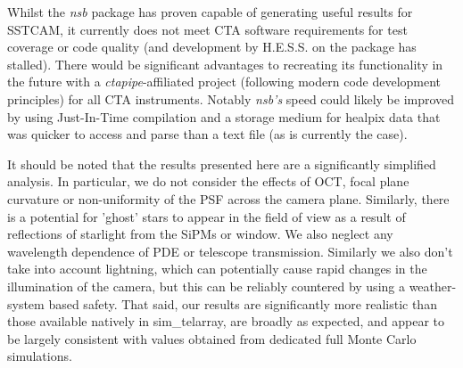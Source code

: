Whilst the \textit{nsb} package has proven capable of generating useful results for SSTCAM, it currently does not meet CTA software requirements for test coverage or code quality (and development by H.E.S.S. on the package has stalled). There would be significant advantages to recreating its functionality in the future with a \textit{ctapipe}-affiliated project (following modern code development principles) for all CTA instruments. Notably \textit{nsb's} speed could likely be improved by using Just-In-Time compilation and a storage medium for healpix data that was quicker to access and parse than a text file (as is currently the case).

It should be noted that the results presented here are a significantly simplified analysis. In particular, we do not consider the effects of OCT, focal plane curvature or non-uniformity of the PSF across the camera plane. Similarly, there is a potential for 'ghost' stars to appear in the field of view as a result of reflections of starlight from the SiPMs or window. We also neglect any wavelength dependence of PDE or telescope transmission. Similarly we also don't take into account lightning, which can potentially cause rapid changes in the illumination of the camera, but this can be reliably countered by using a weather-system based safety. That said, our results are significantly more realistic than those available natively in sim\_telarray, are broadly as expected, and appear to be largely consistent with values obtained from dedicated full Monte Carlo simulations.



